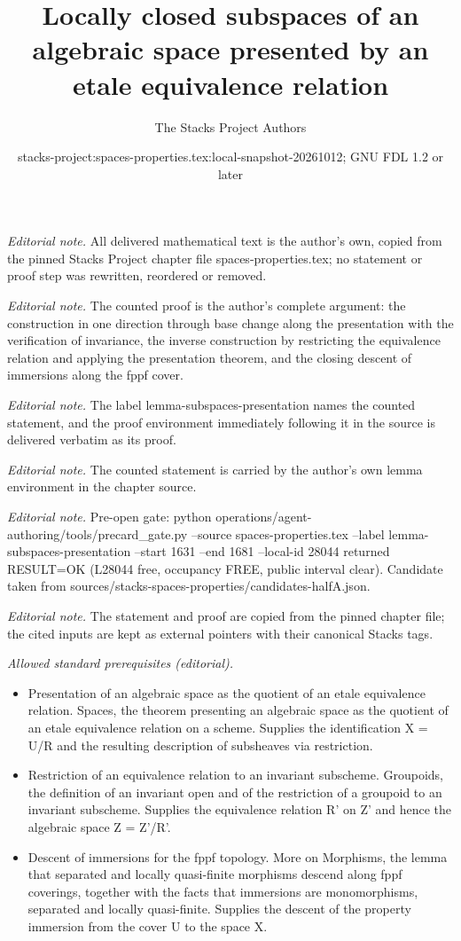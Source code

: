\documentclass[10pt,a4paper]{amsart}
\title{Locally closed subspaces of an algebraic space presented by an etale equivalence relation}
\author{The Stacks Project Authors}
\date{stacks-project:spaces-properties.tex:local-snapshot-20261012; GNU FDL 1.2 or later}
\theoremstyle{plain}
\theoremstyle{definition}
\theoremstyle{remark}
\numberwithin{equation}{subsection}
\begin{document}
\maketitle
\noindent\textit{Editorial note.} All delivered mathematical text is the author's own, copied from the pinned Stacks Project chapter file spaces-properties.tex; no statement or proof step was rewritten, reordered or removed.\par\medskip
\noindent\textit{Editorial note.} The counted proof is the author's complete argument: the construction in one direction through base change along the presentation with the verification of invariance, the inverse construction by restricting the equivalence relation and applying the presentation theorem, and the closing descent of immersions along the fppf cover.\par\medskip
\noindent\textit{Editorial note.} The label lemma-subspaces-presentation names the counted statement, and the proof environment immediately following it in the source is delivered verbatim as its proof.\par\medskip
\noindent\textit{Editorial note.} The counted statement is carried by the author's own lemma environment in the chapter source.\par\medskip
\noindent\textit{Editorial note.} Pre-open gate: python operations/agent-authoring/tools/precard\_gate.py --source spaces-properties.tex --label lemma-subspaces-presentation --start 1631 --end 1681 --local-id 28044 returned RESULT=OK (L28044 free, occupancy FREE, public interval clear). Candidate taken from sources/stacks-spaces-properties/candidates-halfA.json.\par\medskip
\noindent\textit{Editorial note.} The statement and proof are copied from the pinned chapter file; the cited inputs are kept as external pointers with their canonical Stacks tags.\par\medskip
\noindent\textit{Allowed standard prerequisites (editorial).}\begin{itemize}
\item Presentation of an algebraic space as the quotient of an etale equivalence relation. Spaces, the theorem presenting an algebraic space as the quotient of an etale equivalence relation on a scheme. Supplies the identification X = U/R and the resulting description of subsheaves via restriction.
\item Restriction of an equivalence relation to an invariant subscheme. Groupoids, the definition of an invariant open and of the restriction of a groupoid to an invariant subscheme. Supplies the equivalence relation R' on Z' and hence the algebraic space Z = Z'/R'.
\item Descent of immersions for the fppf topology. More on Morphisms, the lemma that separated and locally quasi-finite morphisms descend along fppf coverings, together with the facts that immersions are monomorphisms, separated and locally quasi-finite. Supplies the descent of the property immersion from the cover U to the space X.
\end{itemize}\medskip
\end{document}

